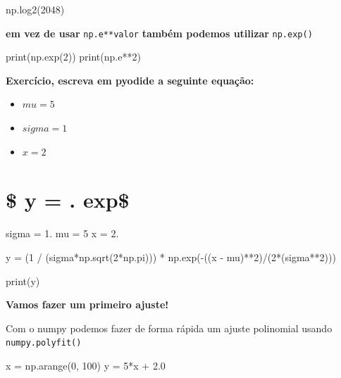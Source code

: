 \documentclass[
  letterpaper,
  DIV=11,
  numbers=noendperiod]{scrreprt}
\newenvironment{Shaded}{\begin{snugshade}}{\end{snugshade}}
\newcommand{\NormalTok}[1]{\textcolor[rgb]{0.00,0.23,0.31}{#1}}
\providecommand{\tightlist}{%
  \setlength{\itemsep}{0pt}\setlength{\parskip}{0pt}}
\begin{document}
\begin{Shaded}
\begin{Highlighting}[]
\NormalTok{np.log2(2048)}
\end{Highlighting}
\end{Shaded}

\textbf{em vez de usar} \texttt{np.e**valor} \textbf{também podemos
utilizar} \texttt{np.exp()}

\begin{Shaded}
\begin{Highlighting}[]
\NormalTok{print(np.exp(2))}
\NormalTok{print(np.e**2)}
\end{Highlighting}
\end{Shaded}

\textbf{Exercício, escreva em pyodide a seguinte equação:}

\begin{itemize}
\tightlist
\item
  \(mu = 5\)
\item
  \(sigma = 1\)
\item
  \(x = 2\)
\end{itemize}

\section{\texorpdfstring{\$ y =  .
exp\$}{\$ y =  . exp\$}}\label{y-.-exp}

\begin{Shaded}
\begin{Highlighting}[]
\NormalTok{sigma = 1.}
\NormalTok{mu = 5}
\NormalTok{x = 2.}

\NormalTok{y  = (1 / (sigma*np.sqrt(2*np.pi))) * np.exp({-}((x {-} mu)**2)/(2*(sigma**2)))}

\NormalTok{print(y)}
\end{Highlighting}
\end{Shaded}

\textbf{Vamos fazer um primeiro ajuste!}

Com o numpy podemos fazer de forma rápida um ajuste polinomial usando
\texttt{numpy.polyfit()}

\begin{Shaded}
\begin{Highlighting}[]
\NormalTok{x = np.arange(0, 100)}
\NormalTok{y = 5*x + 2.0}
\end{Highlighting}
\end{Shaded}
\end{document}
